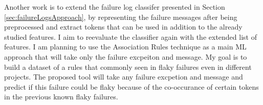 Another work is to extend the failure log classifer presented in Section \ref{sec:failureLogsApproach}, by representing the failure messages after being preprocessed and extract tokens that can be used in addition to the already studied features. I aim to reevaluate the classifier again with the extended list of features. I am planning to use the Association Rules technique as a main ML approach that will take only the failure excpeiton and message. My goal is to build a dataset of a rules that commonly seen in flaky failures even in different projects. The proposed tool will take any failure excpetion and message and predict if this failure could be flaky because of the co-occurance of certain tokens in the previous known flaky failures. 




